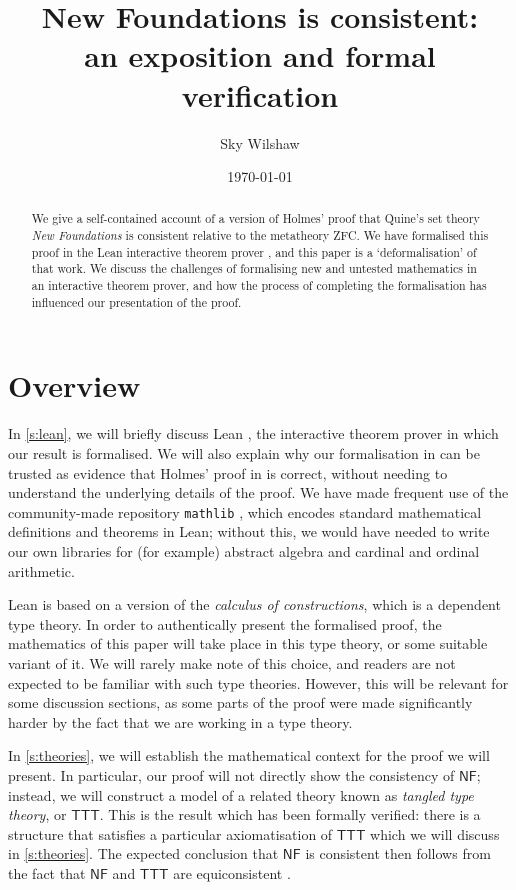 \documentclass{article}
\title{New Foundations is consistent:\\an exposition and formal verification}
\author{Sky Wilshaw}
\date{\today}
\theoremstyle{definition}
\theoremstyle{remark}
\begin{document}
\maketitle

\begin{abstract}
	We give a self-contained account of a version of Holmes' proof \cite{con-nf} that Quine's set theory \emph{New Foundations} \cite{quine-nf} is consistent relative to the metatheory ZFC.
	We have formalised this proof in the Lean interactive theorem prover \cite{leanprover-community-con-nf}, and this paper is a `deformalisation' of that work.
	We discuss the challenges of formalising new and untested mathematics in an interactive theorem prover, and how the process of completing the formalisation has influenced our presentation of the proof.
\end{abstract}

\tableofcontents

\section{Overview}
\label{s:overview}

In \cref{s:lean}, we will briefly discuss Lean \cite{lean}, the interactive theorem prover in which our result is formalised.
We will also explain why our formalisation in \cite{leanprover-community-con-nf} can be trusted as evidence that Holmes' proof in \cite{con-nf} is correct, without needing to understand the underlying details of the proof.
We have made frequent use of the community-made repository \texttt{mathlib} \cite{mathlib2020}, which encodes standard mathematical definitions and theorems in Lean; without this, we would have needed to write our own libraries for (for example) abstract algebra and cardinal and ordinal arithmetic.

Lean is based on a version of the \emph{calculus of constructions}, which is a dependent type theory.
In order to authentically present the formalised proof, the mathematics of this paper will take place in this type theory, or some suitable variant of it.
We will rarely make note of this choice, and readers are not expected to be familiar with such type theories.
However, this will be relevant for some discussion sections, as some parts of the proof were made significantly harder by the fact that we are working in a type theory.

In \cref{s:theories}, we will establish the mathematical context for the proof we will present.
In particular, our proof will not directly show the consistency of \( \mathsf{NF} \); instead, we will construct a model of a related theory known as \emph{tangled type theory}, or \( \mathsf{TTT} \).
This is the result which has been formally verified: there is a structure that satisfies a particular axiomatisation of \( \mathsf{TTT} \) which we will discuss in \cref{s:theories}.
The expected conclusion that \( \mathsf{NF} \) is consistent then follows from the fact that \( \mathsf{NF} \) and \( \mathsf{TTT} \) are equiconsistent \cite{holmes-ttt}.
\end{document}
